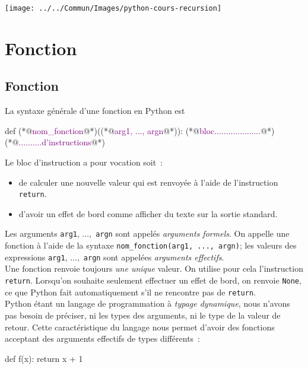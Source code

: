 \documentclass{magnolia}
\begin{document}
\hfill\texttt{[image: ../../Commun/Images/python-cours-recursion]}
\magtoc

\section{Fonction}

\subsection{Fonction}

La syntaxe générale d'une fonction en Python est
\begin{pythoncode}
def (*@\textcolor{purple}{nom\_fonction}@*)((*@\textcolor{purple}{arg1, ..., argn}@*)):
    (*@\textcolor{purple}{bloc....................}@*)
    (*@\textcolor{purple}{..........d'instructions}@*)
\end{pythoncode}

\noindent
Le bloc d'instruction a pour vocation soit~:
\begin{itemize}
\item de calculer une nouvelle valeur qui est renvoyée à l'aide
de l'instruction \verb_return_.
\item d'avoir un effet de bord comme afficher du texte
sur la sortie standard.
\end{itemize}
Les arguments \verb_arg1_, $\ldots,$ \verb_argn_ sont appelés
\emph{arguments formels}. On appelle une fonction à l'aide de la syntaxe
\verb!nom_fonction(arg1, ..., argn)!; les valeurs des expressions
\verb_arg1_, $\ldots,$ \verb_argn_ sont appelées \emph{arguments effectifs}.\\

Une fonction
renvoie toujours \emph{une unique} valeur. On utilise pour cela l'instruction \verb!return!. Lorsqu'on souhaite seulement effectuer un effet de bord, on renvoie \verb!None!, ce que
Python fait automatiquement s'il ne rencontre pas de \verb!return!.\\

Python étant un langage de programmation à \emph{typage dynamique}, nous n'avons pas besoin de
préciser, ni les types des arguments, ni le type de la valeur de retour. Cette caractéristique
du langage nous permet d'avoir des fonctions acceptant des arguments effectifs de types différents~:

\begin{pythoncodeline}
def f(x):
    return x + 1
\end{pythoncodeline}
\end{document}
